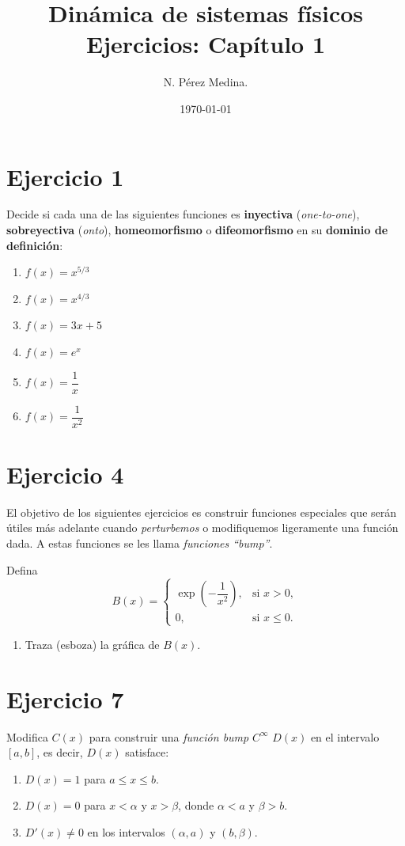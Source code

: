 \documentclass[10pt,a4paper]{article}
\title{\textbf{Dinámica de sistemas físicos}\\Ejercicios: Capítulo 1}
\author{N. Pérez Medina.}
\date{\today}
\begin{document}
\maketitle
\newpage
\section*{Ejercicio 1}
Decide si cada una de las siguientes funciones es \textbf{inyectiva} (\textit{one-to-one}), 
\textbf{sobreyectiva} (\textit{onto}), \textbf{homeomorfismo} o \textbf{difeomorfismo} 
en su \textbf{dominio de definición}:

\begin{enumerate}
    \item $f(x) = x^{5/3}$
    \newpage
    \item $f(x) = x^{4/3}$
    \newpage
    \item $f(x) = 3x + 5$
    \newpage
    \item $f(x) = e^{x}$
    \newpage
    \item $f(x) = \dfrac{1}{x}$
    \newpage
    \item $f(x) = \dfrac{1}{x^{2}}$
\end{enumerate}
\newpage

\section*{Ejercicio 4}
El objetivo de los siguientes ejercicios es construir funciones especiales que serán útiles
más adelante cuando \emph{perturbemos} o modifiquemos ligeramente una función dada.
A estas funciones se les llama \textit{funciones “bump”}.

Defina
\[
B(x)=
\begin{cases}
\exp\!\left(-\dfrac{1}{x^{2}}\right), & \text{si } x>0,\\[6pt]
0, & \text{si } x\le 0.
\end{cases}
\]

\begin{enumerate}
	\item Traza (esboza) la gráfica de $B(x)$.
\end{enumerate}
\newpage

\section*{Ejercicio 7}
Modifica $C(x)$ para construir una \emph{función bump} $C^\infty$ $D(x)$ en el intervalo $[a,b]$, es decir, $D(x)$ satisface:

\begin{enumerate}
    \item $D(x)=1$ para $a \le x \le b$.
    \item $D(x)=0$ para $x<\alpha$ y $x>\beta$, donde $\alpha<a$ y $\beta>b$.
    \item $D'(x)\neq 0$ en los intervalos $(\alpha,a)$ y $(b,\beta)$.
\end{enumerate}
\end{document}
